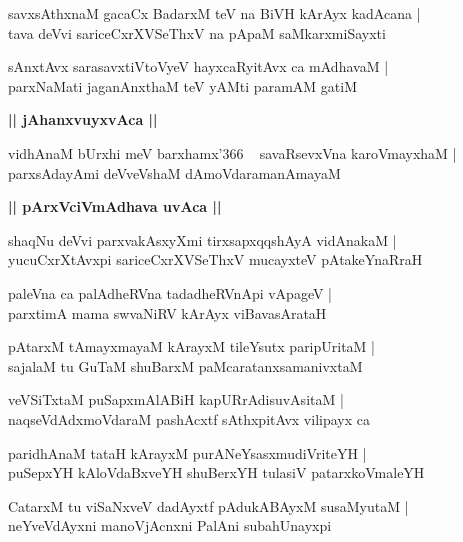 \documentclass[twoside,12pt,openright]{book}
\newcounter{shloka}[chapter]
\def\uvaca#1{\centerline{{\large\textbf{#1}}}}
\begin{document}
\begin{shloka}%
savxsAthxnaM gacaCx BadarxM teV na BiVH kArAyx kadAcana |\\
tava deVvi sariceCxrXVSeThxV na pApaM saMkarxmiSayxti
\end{shloka}

\begin{shloka}%
sAnxtAvx sarasavxtiVtoVyeV hayxcaRyitAvx ca mAdhavaM |\\
parxNaMati jaganAnxthaM teV yAMti paramAM gatiM 
\end{shloka}

\uvaca{|| jAhanxvuyxvAca ||}

\begin{shloka}%
vidhAnaM bUrxhi meV barxhamx\char'366 ~ savaRsevxVna karoVmayxhaM |\\
parxsAdayAmi deVveVshaM dAmoVdaramanAmayaM 
\end{shloka}

\uvaca{|| pArxVciVmAdhava uvAca ||}

\begin{shloka}%
shaqNu deVvi parxvakAsxyXmi tirxsapxqqshAyA vidAnakaM |\\
yucuCxrXtAvxpi sariceCxrXVSeThxV mucayxteV pAtakeYnaRraH 
\end{shloka}

\begin{shloka}%
paleVna ca palAdheRVna tadadheRVnApi vApageV |\\
parxtimA mama swvaNiRV kArAyx viBavasArataH 
\end{shloka}

\begin{shloka}%
pAtarxM tAmayxmayaM kArayxM tileYsutx paripUritaM |\\
sajalaM tu GuTaM shuBarxM paMcaratanxsamanivxtaM 
\end{shloka}

\begin{shloka}%
veVSiTxtaM puSapxmAlABiH kapURrAdisuvAsitaM |\\
naqseVdAdxmoVdaraM pashAcxtf sAthxpitAvx vilipayx ca 
\end{shloka}

\begin{shloka}%
paridhAnaM tataH kArayxM purANeYsasxmudiVriteYH |\\
puSepxYH kAloVdaBxveYH shuBerxYH tulasiV patarxkoVmaleYH
\end{shloka}

\begin{shloka}%
CatarxM tu viSaNxveV dadAyxtf pAdukABAyxM susaMyutaM |\\
neYveVdAyxni manoVjAcnxni PalAni subahUnayxpi
\end{shloka}
\end{document}
